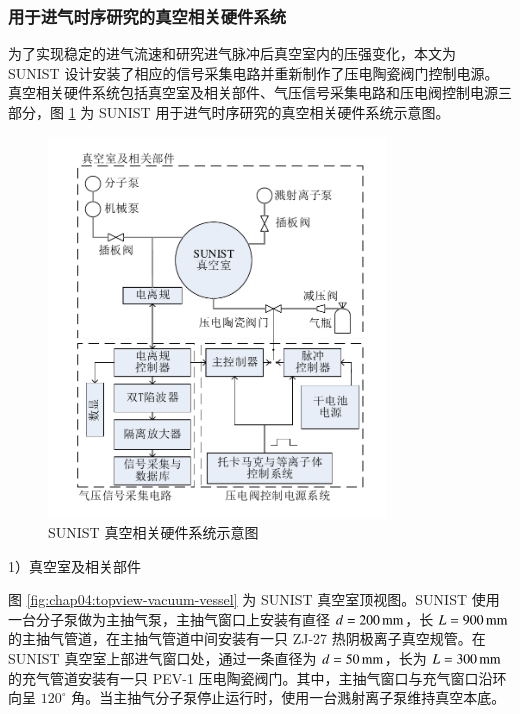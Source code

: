 \subsubsection{用于进气时序研究的真空相关硬件系统}
\label{subsec:vv-related-parts}

为了实现稳定的进气流速和研究进气脉冲后真空室内的压强变化，本文为 SUNIST 设计安装了相应的信号采集电路并重新制作了压电陶瓷阀门控制电源。真空相关硬件系统包括真空室及相关部件、气压信号采集电路和压电阀控制电源三部分，图 \ref{fig:chap04:vacuum-system} 为 SUNIST 用于进气时序研究的真空相关硬件系统示意图。

\begin{figure}
  \centering
  \includegraphics[width=0.8\textwidth]{vacuum-system-4.pdf}
  \caption{SUNIST 真空相关硬件系统示意图}
  \label{fig:chap04:vacuum-system}
\end{figure}

1）真空室及相关部件

图 \ref{fig:chap04:topview-vacuum-vessel} 为 SUNIST 真空室顶视图。SUNIST 使用一台分子泵做为主抽气泵，主抽气窗口上安装有直径 $d=200\,{\rm mm}$，长 $L=900\,{\rm mm}$ 的主抽气管道，在主抽气管道中间安装有一只 ZJ-27\cite{ZJ-27} 热阴极离子真空规管。在 SUNIST 真空室上部进气窗口处，通过一条直径为 $d=50\,{\rm mm}$，长为 $L=300\,{\rm mm}$ 的充气管道安装有一只 PEV-1\cite{PEV-1} 压电陶瓷阀门。其中，主抽气窗口与充气窗口沿环向呈 $120^\circ$ 角。当主抽气分子泵停止运行时，使用一台溅射离子泵维持真空本底。


